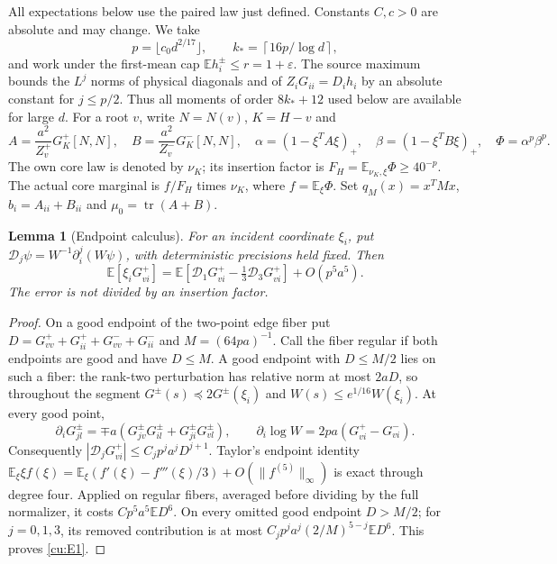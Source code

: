 \documentclass[10pt]{article}
\numberwithin{equation}{section}
\newtheorem{lemma}{Lemma}[section]
\newcommand{\1}{\mathbf1}
\begin{document}
All expectations below use the paired law just defined. Constants $C,c>0$
are absolute and may change. We take
\[
 p=\lfloor c_0d^{2/17}\rfloor,\qquad
 k_*=\left\lceil16p/\log d\right\rceil,
\]
and work under the first-mean cap $\mathbb Eh_i^\pm\le r=1+\varepsilon$.
The source maximum bounds the $L^j$ norms of physical diagonals and of
$Z_iG_{ii}=D_ih_i$ by an absolute constant for $j\le p/2$.
Thus all moments of order $8k_*+12$ used below are available for large $d$.
For a root $v$, write $N=N(v)$, $K=H-v$ and
\[
 A=\frac{a^2}{Z_v^+}G_K^+[N,N],\quad
 B=\frac{a^2}{Z_v^-}G_K^-[N,N],\quad
 \alpha=(1-\xi^TA\xi)_+,\quad\beta=(1-\xi^TB\xi)_+,\quad
 \Phi=\alpha^p\beta^p.
\]
The own core law is denoted by $\nu_K$; its insertion factor is
$F_H=\mathbb E_{\nu_K,\xi}\Phi\ge40^{-p}$. The actual core marginal is
$f/F_H$ times $\nu_K$, where $f=\mathbb E_\xi\Phi$.
Set $q_M(x)=x^TMx$, $b_i=A_{ii}+B_{ii}$ and $\mu_0=\operatorname{tr}(A+B)$.

\begin{lemma}[Endpoint calculus]\label{cu:endpoint}
For an incident coordinate $\xi_i$, put
$\mathcal D_j\psi=W^{-1}\partial_i^j(W\psi)$, with deterministic
precisions held fixed. Then
\[
 \mathbb E[\xi_iG^+_{vi}]
 =\mathbb E[\mathcal D_1G^+_{vi}-\tfrac13\mathcal D_3G^+_{vi}]
       +O(p^5a^5).
 \tag{E1}\label{cu:E1}
\]
The error is not divided by an insertion factor.
\end{lemma}
\begin{proof}
On a good endpoint of the two-point edge fiber put
$D=G^+_{vv}+G^+_{ii}+G^-_{vv}+G^-_{ii}$ and $M=(64pa)^{-1}$.
Call the fiber regular if both endpoints are good and have $D\le M$.
A good endpoint with $D\le M/2$ lies on such a fiber: the rank-two
perturbation has relative norm at most $2aD$, so throughout the segment
$G^\pm(s)\preceq2G^\pm(\xi_i)$ and $W(s)\le e^{1/16}W(\xi_i)$.
At every good point,
\[
 \partial_iG^\pm_{jl}=\mp a(G^\pm_{jv}G^\pm_{il}+G^\pm_{ji}G^\pm_{vl}),
 \qquad \partial_i\log W=2pa(G^+_{vi}-G^-_{vi}).
 \tag{E3}\label{cu:E3}
\]
Consequently $|\mathcal D_jG^+_{vi}|\le C_jp^ja^jD^{j+1}$.
Taylor's endpoint identity
$\mathbb E_\xi\xi f(\xi)=\mathbb E_\xi(f'(\xi)-f'''(\xi)/3)
+O(\|f^{(5)}\|_\infty)$ is exact through degree four. Applied on regular
fibers, averaged before dividing by the full normalizer, it costs
$Cp^5a^5\mathbb ED^6$. On every omitted good endpoint $D>M/2$;
for $j=0,1,3$, its removed contribution is at most
$C_jp^ja^j(2/M)^{5-j}\mathbb ED^6$. This proves \eqref{cu:E1}.
\end{proof}
\end{document}

